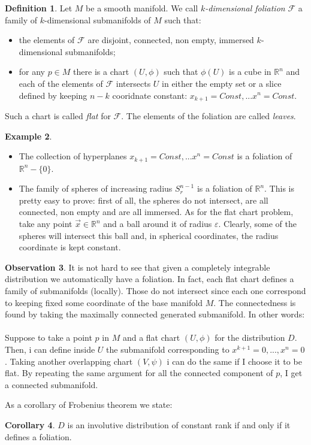 \documentclass[12pt,a4paper]{report}
\theoremstyle{definition}
\newtheorem{Def}{Definition}[chapter]
\theoremstyle{Theorem}
\theoremstyle{break}
\newtheorem{Ex}[Def]{Example}
\theoremstyle{definition}
\newtheorem{Cor}[Def]{Corollary}
\newtheorem{Obs}[Def]{Observation}
\begin{document}
 		\begin{Def}
 			Let $M$ be a smooth manifold. We call \textit{$k$-dimensional foliation} $\mathcal{F}$ a family of $k$-dimensional submanifolds of $M$ such that:
 			\begin{itemize}
 				\item the elements of $\mathcal{F}$ are disjoint, connected, non empty, immersed $k$-dimensional submanifolds;
 				\item for any $p\in M$ there is a chart $(U,\phi)$ such that $\phi(U)$ is a cube in $\mathbb{R}^n$ and each of the elements of $\mathcal{F}$ intersects $U$ in either the empty set or a slice defined by keeping $n-k$ cooridnate constant: $x_{k+1}=Const,...x^n=Const$.
 			\end{itemize}
 			Such a chart is called \textit{flat} for $\mathcal{F}$. The elements of the foliation are called \textit{leaves}.
 		\end{Def}
 		\begin{Ex}
 			\begin{itemize}
 				\item The collection of hyperplanes $x_{k+1}=Const,...x^n=Const$ is a foliation of $\mathbb{R}^n-\{0\}$.
 				\item The family of spheres of increasing radius $S^{n-1}_r$ is a foliation of $\mathbb{R}^n$. This is pretty easy to prove: first of all, the spheres do not intersect, are all connected, non empty and are all immersed. As for the flat chart problem, take any point $\vec{x}\in \mathbb{R}^n$ and a ball around it of radius $\varepsilon$. Clearly, some of the spheres will intersect this ball and, in spherical coordinates, the radius coordinate is kept constant.
 			\end{itemize}
 		\end{Ex}
 		\begin{Obs}
 			It is not hard to see that given a completely integrable distribution we automatically have a foliation. In fact, each flat chart defines a family of submanifolds (locally). Those do not intersect since each one correspond to keeping fixed some coordinate of the base manifold $M$. The connectedness is found by taking the maximally connected generated submanifold. In other words:\\
 			\\
 			Suppose to take a point $p$ in $M$ and a flat chart $(U,\phi)$ for the distribution $D$. Then, i can define inside $U$ the submanifold corresponding to $x^{k+1}=0,...,x^n=0$. Taking another overlapping chart $(V,\psi)$ i can do the same if I choose it to be flat. By repeating the same argument for all the connected component of $p$, I get a connected submanifold.
 		\end{Obs}
 		As a corollary of Frobenius theorem we state:
 		\begin{Cor}
 			$D$ is an involutive distribution of constant rank if and only if it defines a foliation.
 		\end{Cor}
\end{document}
